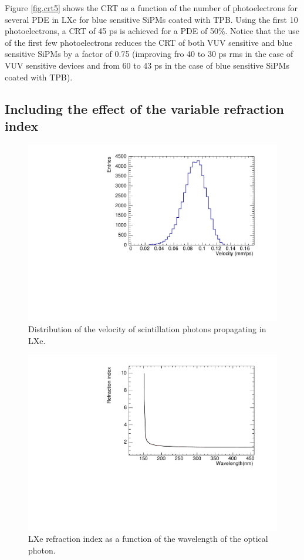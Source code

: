 \documentclass[review]{elsarticle}
\begin{document}
Figure \ref{fig.crt5} shows the CRT as a function of the number of photoelectrons for several PDE in LXe for blue sensitive SiPMs coated with TPB. Using the first 10 photoelectrons, a CRT of 45 ps is achieved for a  PDE of 50\%. Notice that the use of the first few photoelectrons reduces the CRT of both VUV sensitive and blue sensitive SiPMs 
by a factor of 0.75 (improving fro 40 to 30 ps rms in the case of VUV sensitive devices and from 60 to 43 ps in the case of blue sensitive SiPMs coated with TPB).    

\subsection*{Including the effect of the variable refraction index}


\begin{figure}[!bhtp]
	\centering
	\includegraphics[scale=0.5]{../img/VelocityDistrLXe.pdf}
	\caption{\label{fig.vLXe} Distribution of the velocity of scintillation photons propagating in LXe.}
\end{figure}

\begin{figure}[!bhtp]
	\centering
	\includegraphics[scale=0.5]{../img/LXe_n_lambda.pdf}
	\caption{\label{fig.nlambda} LXe refraction index as a function of the wavelength of the optical photon.}
\end{figure}
\end{document}
